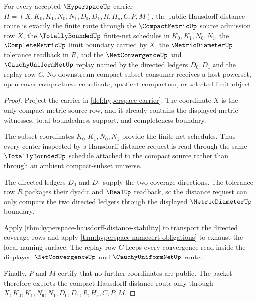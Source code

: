 \begin{theorem}
\label{thm:hyperspace-compact-hausdorff-distance-route}
For every accepted $\HyperspaceUp$ carrier $H=(X,K_0,K_1,N_0,N_1,D_0,D_1,R,H_s,C,P,M)$, the public Hausdorff-distance route is exactly the finite route through the $\CompactMetricUp$ source admission row $X$, the $\TotallyBoundedUp$ finite-net schedules in $K_0,K_1,N_0,N_1$, the $\CompleteMetricUp$ limit boundary carried by $X$, the $\MetricDiameterUp$ tolerance readback in $R$, and the $\NetConvergenceUp$ and $\CauchyUniformNetUp$ replay named by the directed ledgers $D_0,D_1$ and the replay row $C$. No downstream compact-subset consumer receives a host powerset, open-cover compactness coordinate, quotient compactum, or selected limit object.
\end{theorem}
\begin{proof}
Project the carrier in \autoref{def:hyperspace-carrier}. The coordinate $X$ is the only compact metric source row, and it already contains the displayed metric witnesses, total-boundedness support, and completeness boundary.

The subset coordinates $K_0,K_1,N_0,N_1$ provide the finite net schedules. Thus every center inspected by a Hausdorff-distance request is read through the same $\TotallyBoundedUp$ schedule attached to the compact source rather than through an ambient compact-subset universe.

The directed ledgers $D_0$ and $D_1$ supply the two coverage directions. The tolerance row $R$ packages their dyadic and $\RealUp$ readback, so the distance request can only compare the two directed ledgers through the displayed $\MetricDiameterUp$ boundary.

Apply \autoref{thm:hyperspace-hausdorff-distance-stability} to transport the directed coverage rows and apply \autoref{thm:hyperspace-namecert-obligations} to exhaust the local naming surface. The replay row $C$ keeps every convergence read inside the displayed $\NetConvergenceUp$ and $\CauchyUniformNetUp$ route.

Finally, $P$ and $M$ certify that no further coordinates are public. The packet therefore exports the compact Hausdorff-distance route only through $X,K_0,K_1,N_0,N_1,D_0,D_1,R,H_s,C,P,M$.
\end{proof}

